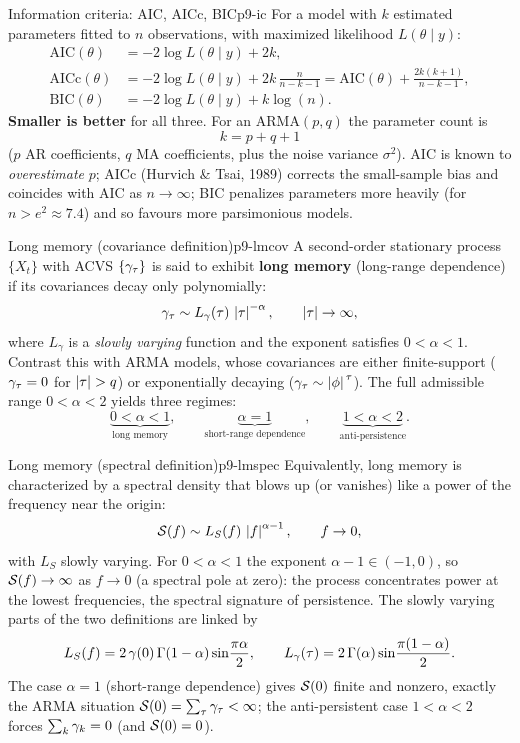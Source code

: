 \begin{definition}{Information criteria: AIC, AICc, BIC}{p9-ic}
For a model with $k$ estimated parameters fitted to $n$ observations, with
maximized likelihood $L(\theta\mid y)$:
\[
\begin{aligned}
\mathrm{AIC}(\theta)  &= -2\log L(\theta\mid y) + 2k, \\[2pt]
\mathrm{AICc}(\theta) &= -2\log L(\theta\mid y) + 2k\,\frac{n}{n-k-1}
                       = \mathrm{AIC}(\theta) + \frac{2k(k+1)}{n-k-1}, \\[2pt]
\mathrm{BIC}(\theta)  &= -2\log L(\theta\mid y) + k\log(n).
\end{aligned}
\]
\textbf{Smaller is better} for all three. For an ARMA$(p,q)$ the parameter count
is
\[
k = p+q+1
\]
($p$ AR coefficients, $q$ MA coefficients, plus the noise variance $\sigma^2$).
AIC is known to \emph{overestimate} $p$; AICc (Hurvich \& Tsai, 1989) corrects
the small-sample bias and coincides with AIC as $n\to\infty$; BIC penalizes
parameters more heavily (for $n>e^2\approx 7.4$) and so favours more
parsimonious models.
\end{definition}

\begin{definition}{Long memory (covariance definition)}{p9-lmcov}
A second-order stationary process $\{X_t\}$ with ACVS $\{\gamma_\tau\}$ is said to
exhibit \textbf{long memory} (long-range dependence) if its covariances decay
only polynomially:
\[
\gamma_\tau \sim L_\gamma(\tau)\,\left\lvert \tau \right\rvert^{-\alpha},\qquad \left\lvert \tau \right\rvert\to\infty,
\]
where $L_\gamma$ is a \emph{slowly varying} function and the exponent satisfies
$0<\alpha<1$. Contrast this with ARMA models, whose covariances are either
finite-support ($\gamma_\tau=0$ for $\left\lvert \tau \right\rvert>q$) or exponentially decaying
($\gamma_\tau\sim\left\lvert \phi \right\rvert^{\,\tau}$). The full admissible range $0<\alpha<2$
yields three regimes:
\[
\underbrace{0<\alpha<1}_{\text{long memory}}, \qquad
\underbrace{\alpha=1}_{\text{short-range dependence}}, \qquad
\underbrace{1<\alpha<2}_{\text{anti-persistence}} .
\]
\end{definition}

\begin{definition}{Long memory (spectral definition)}{p9-lmspec}
Equivalently, long memory is characterized by a spectral density that blows up
(or vanishes) like a power of the frequency near the origin:
\[
\mathcal{S}(f) \sim L_S(f)\,\left\lvert f \right\rvert^{\alpha-1},\qquad f\to0 ,
\]
with $L_S$ slowly varying. For $0<\alpha<1$ the exponent $\alpha-1\in(-1,0)$, so
$\mathcal{S}(f)\to\infty$ as $f\to0$ (a spectral pole at zero): the process concentrates
power at the lowest frequencies, the spectral signature of persistence. The
slowly varying parts of the two definitions are linked by
\[
L_S(f) = 2\,\gamma(0)\,\Gamma(1-\alpha)\sin\!\frac{\pi\alpha}{2},\qquad
L_\gamma(\tau) = 2\,\Gamma(\alpha)\sin\!\frac{\pi(1-\alpha)}{2}.
\]
The case $\alpha=1$ (short-range dependence) gives $\mathcal{S}(0)$ finite and nonzero,
exactly the ARMA situation $\mathcal{S}(0)=\sum_\tau\gamma_\tau<\infty$; the
anti-persistent case $1<\alpha<2$ forces $\sum_k\gamma_k=0$ (and $\mathcal{S}(0)=0$).
\end{definition}

